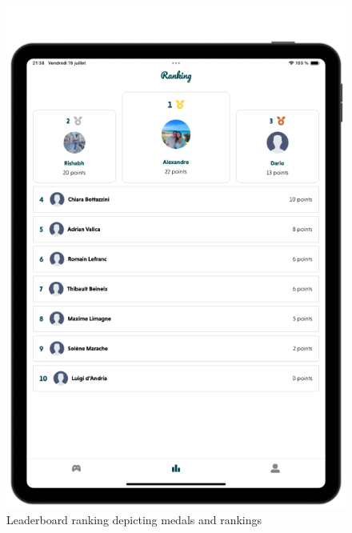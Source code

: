 \begin{figure}[H]
    \centering
    \begin{minipage}[b]{0.43\linewidth}
        \centering
        \includegraphics[width=\linewidth]{TabletUI/Leaderboard ranking depicting medals and rankings.png}
        \caption{Leaderboard ranking depicting medals and rankings}
    \end{minipage}
    \hspace{0.02\linewidth}
    \begin{minipage}[b]{0.43\linewidth}
        \centering

\end{minipage}
\end{figure}
